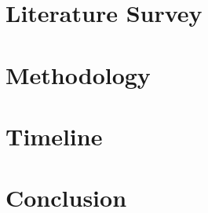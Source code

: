 \documentclass[11pt]{article}
\begin{document}
\section{Literature Survey}
\label{section:literaturesurvey}

\section{Methodology}
\label{section:methodology}

\section{Timeline}
\label{section:timeline}

\section{Conclusion}
\end{document}
